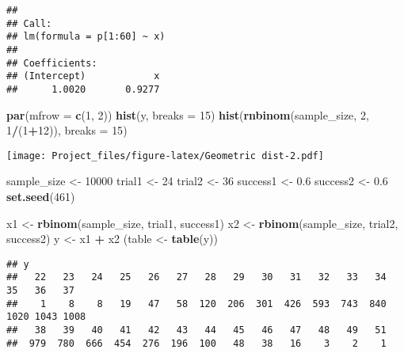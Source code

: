 \documentclass[
]{article}
\newenvironment{Shaded}{\begin{snugshade}}{\end{snugshade}}
\newcommand{\AttributeTok}[1]{\textcolor[rgb]{0.13,0.29,0.53}{#1}}
\newcommand{\DecValTok}[1]{\textcolor[rgb]{0.00,0.00,0.81}{#1}}
\newcommand{\FloatTok}[1]{\textcolor[rgb]{0.00,0.00,0.81}{#1}}
\newcommand{\FunctionTok}[1]{\textcolor[rgb]{0.13,0.29,0.53}{\textbf{#1}}}
\newcommand{\NormalTok}[1]{#1}
\newcommand{\OtherTok}[1]{\textcolor[rgb]{0.56,0.35,0.01}{#1}}
\newcommand{\SpecialCharTok}[1]{\textcolor[rgb]{0.81,0.36,0.00}{\textbf{#1}}}
\begin{document}
\begin{verbatim}
## 
## Call:
## lm(formula = p[1:60] ~ x)
## 
## Coefficients:
## (Intercept)            x  
##      1.0020       0.9277
\end{verbatim}

\begin{Shaded}
\begin{Highlighting}[]
\FunctionTok{par}\NormalTok{(}\AttributeTok{mfrow =} \FunctionTok{c}\NormalTok{(}\DecValTok{1}\NormalTok{, }\DecValTok{2}\NormalTok{))}
\FunctionTok{hist}\NormalTok{(y, }\AttributeTok{breaks =} \DecValTok{15}\NormalTok{)}
\FunctionTok{hist}\NormalTok{(}\FunctionTok{rnbinom}\NormalTok{(sample\_size, }\DecValTok{2}\NormalTok{, }\DecValTok{1}\SpecialCharTok{/}\NormalTok{(}\DecValTok{1}\SpecialCharTok{+}\DecValTok{12}\NormalTok{)), }\AttributeTok{breaks =} \DecValTok{15}\NormalTok{)}
\end{Highlighting}
\end{Shaded}

\texttt{[image: Project\_files/figure-latex/Geometric dist-2.pdf]}

\begin{Shaded}
\begin{Highlighting}[]
\NormalTok{sample\_size }\OtherTok{\textless{}{-}} \DecValTok{10000}
\NormalTok{trial1 }\OtherTok{\textless{}{-}} \DecValTok{24}
\NormalTok{trial2 }\OtherTok{\textless{}{-}} \DecValTok{36}
\NormalTok{success1 }\OtherTok{\textless{}{-}} \FloatTok{0.6}
\NormalTok{success2 }\OtherTok{\textless{}{-}} \FloatTok{0.6}
\FunctionTok{set.seed}\NormalTok{(}\DecValTok{461}\NormalTok{)}

\NormalTok{x1 }\OtherTok{\textless{}{-}} \FunctionTok{rbinom}\NormalTok{(sample\_size, trial1, success1)}
\NormalTok{x2 }\OtherTok{\textless{}{-}} \FunctionTok{rbinom}\NormalTok{(sample\_size, trial2, success2)}
\NormalTok{y }\OtherTok{\textless{}{-}}\NormalTok{ x1 }\SpecialCharTok{+}\NormalTok{ x2}
\NormalTok{(table }\OtherTok{\textless{}{-}} \FunctionTok{table}\NormalTok{(y))}
\end{Highlighting}
\end{Shaded}

\begin{verbatim}
## y
##   22   23   24   25   26   27   28   29   30   31   32   33   34   35   36   37 
##    1    8    8   19   47   58  120  206  301  426  593  743  840 1020 1043 1008 
##   38   39   40   41   42   43   44   45   46   47   48   49   51 
##  979  780  666  454  276  196  100   48   38   16    3    2    1
\end{verbatim}
\end{document}
